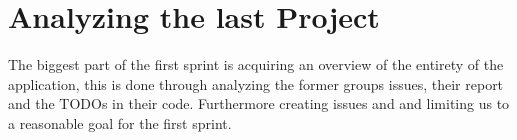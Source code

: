 \section{Analyzing the last Project}

The biggest part of the first sprint is acquiring an overview of the entirety of the application, this is done through analyzing the former groups issues, their report and the TODOs in their code. Furthermore creating issues and and limiting us to a reasonable goal for the first sprint.


